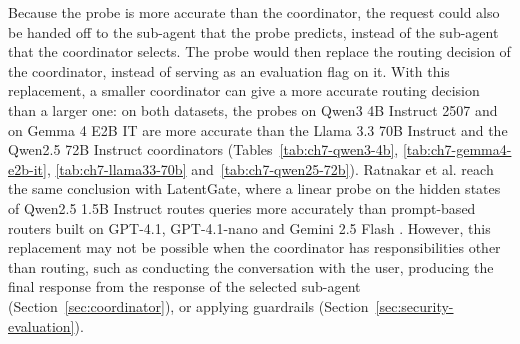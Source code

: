 Because the probe is more accurate than the coordinator, the request could also be handed off to the sub-agent that the probe predicts, instead of the sub-agent that the coordinator selects. The probe would then replace the routing decision of the coordinator, instead of serving as an evaluation flag on it. With this replacement, a smaller coordinator can give a more accurate routing decision than a larger one: on both datasets, the probes on Qwen3 4B Instruct 2507 and on Gemma 4 E2B IT are more accurate than the Llama 3.3 70B Instruct and the Qwen2.5 72B Instruct coordinators (Tables~\ref{tab:ch7-qwen3-4b}, \ref{tab:ch7-gemma4-e2b-it}, \ref{tab:ch7-llama33-70b} and~\ref{tab:ch7-qwen25-72b}). Ratnakar et al. reach the same conclusion with LatentGate, where a linear probe on the hidden states of Qwen2.5 1.5B Instruct routes queries more accurately than prompt-based routers built on GPT-4.1, GPT-4.1-nano and Gemini 2.5 Flash \cite{ratnakarLatentGateLowLatencySemantic2026}. However, this replacement may not be possible when the coordinator has responsibilities other than routing, such as conducting the conversation with the user, producing the final response from the response of the selected sub-agent (Section~\ref{sec:coordinator}), or applying guardrails (Section~\ref{sec:security-evaluation}).
